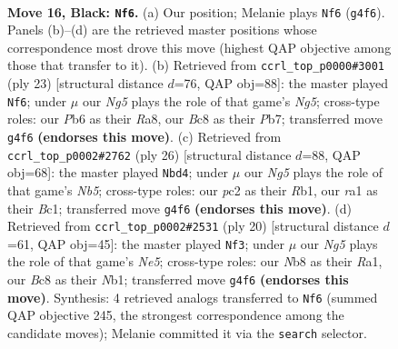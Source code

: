 \documentclass[11pt]{article}
\begin{document}
\clearpage

\begin{figure}[p]\centering
\begin{subfigure}{0.46\textwidth}\centering
\resizebox{\linewidth}{!}{%
\newchessgame
\chessboard[
  setfen={1nb2rk1/r3qpp1/pp1p4/1P2p2p/P3P1n1/2NB1N2/2PQ1PPP/R4RK1 b - - 0 16},
  showmover=false,
  pgfstyle=straightmove, color=movearrow, markmove={g4-f6}
]}
\caption{}
\end{subfigure}\hfill
\begin{subfigure}{0.46\textwidth}\centering
\resizebox{\linewidth}{!}{%
\newchessgame
\chessboard[
  setfen={r4rk1/pp2qppp/2npb3/4p3/4P1n1/1BN2N2/PPP1QPPP/R4RK1 b - - 3 12},
  showmover=false,
  pgfstyle=straightmove, color=movearrow, markmove={g4-f6}
]}
\caption{}
\end{subfigure}
\\[4pt]
\begin{subfigure}{0.46\textwidth}\centering
\resizebox{\linewidth}{!}{%
\newchessgame
\chessboard[
  setfen={rqbr2k1/4bppp/1pnppn2/pN6/1PP1P3/P2B1N2/5PPP/1RBQ1RK1 w - - 4 14},
  showmover=false,
  pgfstyle=straightmove, color=movearrow, markmove={b5-d4}
]}
\caption{}
\end{subfigure}\hfill
\begin{subfigure}{0.46\textwidth}\centering
\resizebox{\linewidth}{!}{%
\newchessgame
\chessboard[
  setfen={r4rk1/p1qpbppp/np2pn2/2pPN3/2P5/6P1/PP2PPKP/RNBQR3 w - - 1 11},
  showmover=false,
  pgfstyle=straightmove, color=movearrow, markmove={e5-f3}
]}
\caption{}
\end{subfigure}
\caption{\textbf{Move 16, Black: \texttt{Nf6}.} (a) Our position; Melanie plays \texttt{Nf6} (\texttt{g4f6}). Panels (b)--(d) are the retrieved master positions whose correspondence most drove this move (highest QAP objective among those that transfer to it). (b) Retrieved from \texttt{ccrl\_top\_p0000\#3001} (ply 23) [structural distance $d$=76, QAP obj=88]: the master played \texttt{Nf6}; under $\mu$ our \emph{Ng5} plays the role of that game's \emph{Ng5}; cross-type roles: our \emph{P}b6 as their \emph{R}a8, our \emph{B}c8 as their \emph{P}b7; transferred move \texttt{g4f6} \textbf{(endorses this move)}. (c) Retrieved from \texttt{ccrl\_top\_p0002\#2762} (ply 26) [structural distance $d$=88, QAP obj=68]: the master played \texttt{Nbd4}; under $\mu$ our \emph{Ng5} plays the role of that game's \emph{Nb5}; cross-type roles: our \emph{p}c2 as their \emph{R}b1, our \emph{r}a1 as their \emph{B}c1; transferred move \texttt{g4f6} \textbf{(endorses this move)}. (d) Retrieved from \texttt{ccrl\_top\_p0002\#2531} (ply 20) [structural distance $d$=61, QAP obj=45]: the master played \texttt{Nf3}; under $\mu$ our \emph{Ng5} plays the role of that game's \emph{Ne5}; cross-type roles: our \emph{N}b8 as their \emph{R}a1, our \emph{B}c8 as their \emph{N}b1; transferred move \texttt{g4f6} \textbf{(endorses this move)}. Synthesis: 4 retrieved analogs transferred to \texttt{Nf6} (summed QAP objective 245, the strongest correspondence among the candidate moves); Melanie committed it via the \texttt{search} selector.}
\label{fig:thought-m31}
\end{figure}
\end{document}
